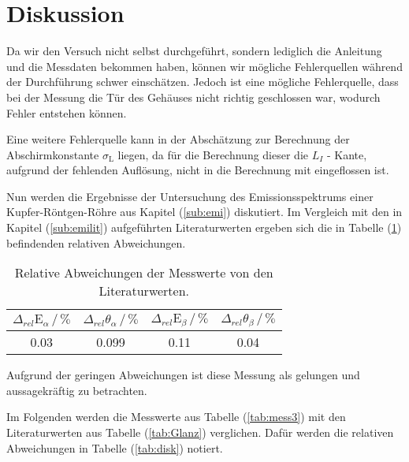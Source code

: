 \newpage
\section{Diskussion}
Da wir den Versuch nicht selbst durchgeführt, sondern lediglich die Anleitung und die Messdaten bekommen haben, können wir mögliche Fehlerquellen während der Durchführung schwer einschätzen. 
Jedoch ist eine mögliche Fehlerquelle, dass bei der Messung die Tür des Gehäuses nicht richtig geschlossen war, wodurch Fehler entstehen können.

\noindent
Eine weitere Fehlerquelle kann in der Abschätzung zur Berechnung der Abschirmkonstante $\sigma_\text{L}$ liegen, da für die Berechnung dieser die $L_I$ - Kante, aufgrund der fehlenden 
Auflösung, nicht in die Berechnung mit eingeflossen ist.

\noindent
Nun werden die Ergebnisse der Untersuchung des Emissionsspektrums einer Kupfer-Röntgen-Röhre aus Kapitel (\ref{sub:emi}) diskutiert.
Im Vergleich mit den in Kapitel (\ref{sub:emilit}) aufgeführten Literaturwerten ergeben sich die in Tabelle (\ref{tab:diskemi}) befindenden relativen Abweichungen.

\begin{table}
    \centering
    \caption{Relative Abweichungen der Messwerte von den Literaturwerten.}
    \begin{tabular}{c c c c}
    \toprule
    $\Delta_{rel}\text{E}_\alpha \,/\, \%$ & $\Delta_{rel}\theta_\alpha \,/\, \% $ & $\Delta_{rel}\text{E}_\beta \,/\, \%$ &$\Delta_{rel}\theta_\beta \,/\, \% $\\
    \midrule 
    0.03& 0.099& 0.11& 0.04 \\
    \bottomrule
    \end{tabular}
    \label{tab:diskemi}
    \end{table}

\noindent
Aufgrund der geringen Abweichungen ist diese Messung als gelungen und aussagekräftig zu betrachten.

\noindent
Im Folgenden werden die Messwerte aus Tabelle (\ref{tab:mess3}) mit den Literaturwerten aus Tabelle (\ref{tab:Glanz}) verglichen.
Dafür werden die relativen Abweichungen in Tabelle (\ref{tab:disk}) notiert.

